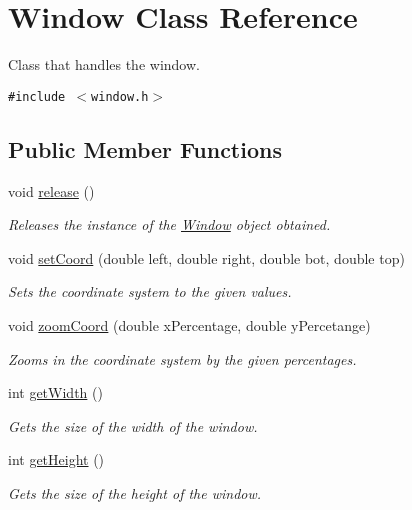 \hypertarget{class_window}{
\section{Window Class Reference}
\label{class_window}
}
Class that handles the window.  


{\tt \#include $<$window.h$>$}

\subsection*{Public Member Functions}
\begin{CompactItemize}
\item 
void \hyperlink{class_window_07c271fe1f0931b0c9ee269199937880}{release} ()
\begin{CompactList}\small\item\em Releases the instance of the \hyperlink{class_window}{Window} object obtained. \item\end{CompactList}\item 
void \hyperlink{class_window_06c6909e28c6d0e40fd1cdd8114292cf}{setCoord} (double left, double right, double bot, double top)
\begin{CompactList}\small\item\em Sets the coordinate system to the given values. \item\end{CompactList}\item 
void \hyperlink{class_window_17bf4f56e07ed30749573b72e81353d9}{zoomCoord} (double xPercentage, double yPercetange)
\begin{CompactList}\small\item\em Zooms in the coordinate system by the given percentages. \item\end{CompactList}\item 
int \hyperlink{class_window_2d459fe21a48b6a41834a32a6c84fe2e}{getWidth} ()
\begin{CompactList}\small\item\em Gets the size of the width of the window. \item\end{CompactList}\item 
int \hyperlink{class_window_02acaaf02d8b63d4bd74d99482fe3a78}{getHeight} ()
\begin{CompactList}\small\item\em Gets the size of the height of the window. \item\end{CompactList}\item 

\end{CompactItemize}
